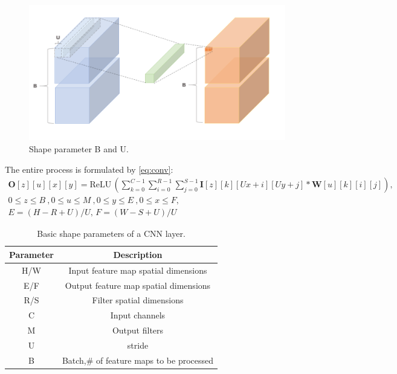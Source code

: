 \begin{figure}[h]
    \centering
    \includegraphics[width=1\linewidth]{inc/3_low_numeric_convolution_neural_network/figure/convolution_2.png}
    \caption{Shape parameter B and U.}
    \label{fig:conv_2}
\end{figure}
The entire process is formulated by \autoref{eq:conv}:
\begin{equation}
    \begin{aligned}\label{eq:conv}
    \boldsymbol{O}[z][u][x][y]=\text{ReLU}\,(
        \sum^{C-1}_{k=0}\sum^{R-1}_{i=0}\sum^{S-1}_{j=0}\boldsymbol{I}[z][k][Ux+i][Uy+j]*\boldsymbol{W}[u][k][i][j]
    ), \\
    0\leq z\leq B\ , 0\leq u\leq M\ , 0\leq y\leq E\ , 0\leq x\leq F, \\
    E=(H-R+U)/U,\,F=(W-S+U)/U
    \end{aligned}
\end{equation}


\begin{table}
    \caption{Basic shape parameters of a CNN layer.}
    \label{tab:cnn_shape}
    \centering
    \footnotesize 
        \begin{tabular}{cc}
        \toprule
        Parameter & Description \\
        \midrule
        H/W & Input feature map spatial dimensions\\
        E/F & Output feature map spatial dimensions\\
        R/S & Filter spatial dimensions\\
        C & Input channels\\
        M & Output filters\\
        U & stride\\
        B & Batch,\# of feature maps to be processed\\
        \bottomrule
        \end{tabular}
\end{table}


